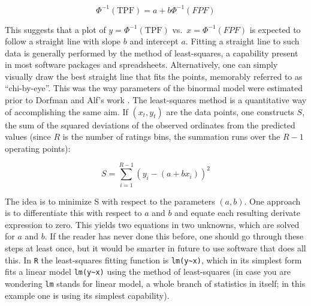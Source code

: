 \documentclass[
]{book}
\begin{document}
\begin{equation*} 
\Phi^{-1}\left ( \text{TPF} \right ) = a + b \Phi^{-1}\left ( FPF \right )
\end{equation*}

This suggests that a plot of \(y = \Phi^{-1}\left ( \text{TPF} \right )\) vs.~\(x=\Phi^{-1}\left ( FPF \right )\) is expected to follow a straight line with slope \(b\) and intercept \(a\). Fitting a straight line to such data is generally performed by the method of least-squares, a capability present in most software packages and spreadsheets. Alternatively, one can simply visually draw the best straight line that fits the points, memorably referred to \citep{RN300} as ``chi-by-eye''. This was the way parameters of the binormal model were estimated prior to Dorfman and Alf's work \citep{RN1081}. The least-squares method is a quantitative way of accomplishing the same aim. If \(\left ( x_t,y_t \right )\) are the data points, one constructs \(S\), the sum of the squared deviations of the observed ordinates from the predicted values (since \(R\) is the number of ratings bins, the summation runs over the \(R-1\) operating points):

\begin{equation*} 
S  = \sum_{i=1}^{R-1}\left ( y_i - \left ( a + bx_i \right ) \right )^2
\end{equation*}

The idea is to minimize S with respect to the parameters \((a,b)\). One approach is to differentiate this with respect to \(a\) and \(b\) and equate each resulting derivate expression to zero. This yields two equations in two unknowns, which are solved for \(a\) and \(b\). If the reader has never done this before, one should go through these steps at least once, but it would be smarter in future to use software that does all this. In \texttt{R} the least-squares fitting function is \texttt{lm(y\textasciitilde{}x)}, which in its simplest form fits a linear model \texttt{lm(y\textasciitilde{}x)} using the method of least-squares (in case you are wondering \texttt{lm} stands for linear model, a whole branch of statistics in itself; in this example one is using its simplest capability).
\end{document}
